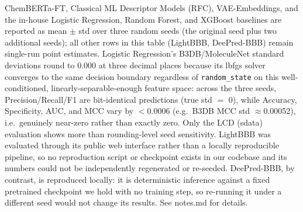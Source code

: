 \documentclass[conference]{IEEEtran}
\begin{document}
\begin{table}[htbp]
\vspace{2pt}
{\footnotesize ChemBERTa-FT, Classical ML Descriptor Models (RFC),
VAE-Embeddings, and the in-house Logistic Regression, Random Forest, and
XGBoost baselines are reported as mean $\pm$ std over three random seeds
(the original seed plus two additional seeds); all other rows in this
table (LightBBB, DeePred-BBB) remain single-run point estimates.
Logistic Regression's B3DB/MoleculeNet standard deviations round to
0.000 at three decimal places because its lbfgs solver converges to
the same decision boundary regardless of \texttt{random\_state} on
this well-conditioned, linearly-separable-enough feature space: across
the three seeds, Precision/Recall/F1 are bit-identical predictions
(true std $=$ 0), while Accuracy, Specificity, AUC, and MCC vary by
$<$0.0006 (e.g.\ B3DB MCC std $\approx$0.00052), i.e.\ genuinely
near-zero rather than exactly zero. Only the LCD (sdata) evaluation
shows more than rounding-level seed sensitivity.
LightBBB was evaluated through its public web interface rather than a
locally reproducible pipeline, so no reproduction script or checkpoint
exists in our codebase and its numbers could not be independently
regenerated or re-seeded. DeePred-BBB, by contrast, is reproduced
locally: it is deterministic inference against a fixed pretrained
checkpoint we hold with no training step, so re-running it under a
different seed would not change its results. See notes.md for details.}
\end{table}
\end{document}
